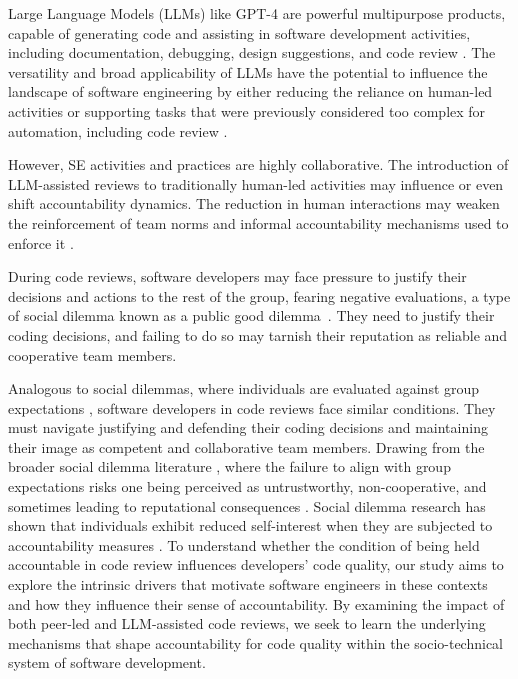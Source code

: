Large Language Models (LLMs) like GPT-4 are powerful multipurpose products, capable of generating code and assisting in software development activities, including documentation, debugging, design suggestions, and code review \cite{fan2023large}. The versatility and broad applicability of LLMs have the potential to influence the landscape of software engineering by either reducing the reliance on human-led activities or supporting tasks that were previously considered too complex for automation, including code review \cite{svyatkovskiy2020,zohair2018future}.
 
However, SE activities and practices are highly collaborative. The introduction of LLM-assisted reviews to traditionally human-led activities may influence or even shift accountability dynamics. The reduction in human interactions may weaken the reinforcement of team norms and informal accountability mechanisms used to enforce it \citep{alami2024understanding}.

During code reviews, software developers may face pressure to justify their decisions and actions to the rest of the group, fearing negative evaluations, a type of social dilemma known as a public good dilemma~\citep{de2008reputational,leary2019self,tyler1999people}. They need to justify their coding decisions, and failing to do so may tarnish their reputation as reliable and cooperative team members. 

Analogous to social dilemmas, where individuals are evaluated against group expectations \cite{de2007justifying}, software developers in code reviews face similar conditions. They must navigate justifying and defending their coding decisions and maintaining their image as competent and collaborative team members. Drawing from the broader social dilemma literature \cite{de2003accountability,de2001less}, where the failure to align with group expectations risks one being perceived as untrustworthy, non-cooperative, and sometimes leading to reputational consequences \cite{de2009paying,de2007justifying}. Social dilemma research has shown that individuals exhibit reduced self-interest when they are subjected to accountability measures \cite{de2009paying,de2007justifying}. To understand whether the condition of being held accountable in code review influences developers' code quality, our study aims to explore the intrinsic drivers that motivate software engineers in these contexts and how they influence their sense of accountability. By examining the impact of both peer-led and LLM-assisted code reviews, we seek to learn the underlying mechanisms that shape accountability for code quality within the socio-technical system of software development. 

